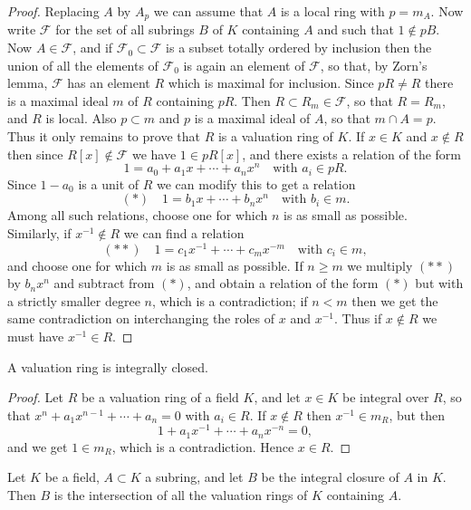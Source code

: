 \begin{proof}
Replacing $A$ by $A_p$ we can assume that $A$ is a local ring with $p = m_A$.
Now write $\mathcal{F}$ for the set of all subrings $B$ of $K$ containing $A$ and such that
$1 \notin pB$. Now $A \in \mathcal{F}$, and if $\mathcal{F}_0 \subset \mathcal{F}$ is a subset totally ordered by inclusion
then the union of all the elements of $\mathcal{F}_0$ is again an element of $\mathcal{F}$, so that, by
Zorn's lemma, $\mathcal{F}$ has an element $R$ which is maximal for inclusion. Since
$pR \neq R$ there is a maximal ideal $m$ of $R$ containing $pR$. Then $R \subset R_m \in \mathcal{F}$, so
that $R = R_m$, and $R$ is local. Also $p \subset m$ and $p$ is a maximal ideal of $A$, so that
$m \cap A = p$. Thus it only remains to prove that $R$ is a valuation ring of $K$. If
$x \in K$ and $x \notin R$ then since $R[x] \notin \mathcal{F}$ we have $1 \in pR[x]$, and there
exists a relation of the form
\[
  1 = a_0 + a_1x + \cdots + a_nx^n \quad \text{with } a_i \in pR.
\]
Since $1 - a_0$ is a unit of $R$ we can modify this to get a relation
\[
  (*) \quad 1 = b_1x + \cdots + b_nx^n \quad \text{with } b_i \in m.
\]
Among all such relations, choose one for which $n$ is as small as possible.
Similarly, if $x^{-1} \notin R$ we can find a relation
\[
  (**) \quad 1 = c_1x^{-1} + \cdots + c_mx^{-m} \quad \text{with } c_i \in m,
\]
and choose one for which $m$ is as small as possible. If $n \ge m$ we multiply
$(**)$ by $b_nx^n$ and subtract from $(*)$, and obtain a relation of the form $(*)$
but with a strictly smaller degree $n$, which is a contradiction; if $n < m$ then
we get the same contradiction on interchanging the roles of $x$ and $x^{-1}$.
Thus if $x \notin R$ we must have $x^{-1} \in R$.
\end{proof}

\begin{theorem}\label{thm:10.3}
A valuation ring is integrally closed.
\end{theorem}

\begin{proof}
Let $R$ be a valuation ring of a field $K$, and let $x \in K$ be integral over $R$,
so that $x^n + a_1x^{n-1} + \cdots + a_n = 0$ with $a_i \in R$. If $x \notin R$ then $x^{-1} \in m_R$, but then
\[
  1 + a_1x^{-1} + \cdots + a_nx^{-n} = 0,
\]
and we get $1 \in m_R$, which is a contradiction. Hence $x \in R$.
\end{proof}

\begin{theorem}\label{thm:10.4}
Let $K$ be a field, $A \subset K$ a subring, and let $B$ be the integral
closure of $A$ in $K$. Then $B$ is the intersection of all the valuation rings of $K$
containing $A$.
\end{theorem}

